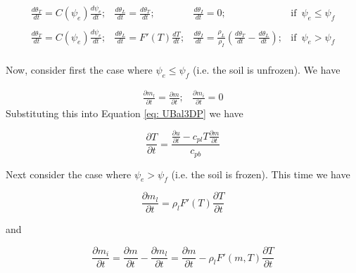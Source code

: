 \documentclass[10pt,a4paper]{article}
\begin{document}
\begin{equation} \label{eq_thetaPart}
	\begin{array}{llll}
		\displaystyle \frac{d\theta_T}{dt} = C(\psi_e)\frac{d\psi_e}{dt};
		& \displaystyle \frac{d\theta_L}{dt} = \frac{d\theta_T}{dt};
		& \displaystyle \frac{d\theta_I}{dt} = 0;
		& \displaystyle \mathrm{if}\hspace{6pt} \psi_e\leq\psi_f\\
		\\
		\displaystyle \frac{d\theta_T}{dt} = C(\psi_e)\frac{d\psi_e}{dt};
		& \displaystyle \frac{d\theta_L}{dt} = F'(T)\frac{dT}{dt};
		& \displaystyle \frac{d\theta_I}{dt} = \frac{\rho_L}{\rho_I}\left(\frac{d\theta_T}{dt}-\frac{d\theta_L}{dt}\right);
		& \displaystyle \mathrm{if}\hspace{6pt} \psi_e>\psi_f\\
	\end{array}
\end{equation}

Now, consider first the case where $\psi_e \leq \psi_f$ (i.e. the soil is unfrozen). We have 

\begin{equation}
	\begin{array}{cc}
\displaystyle \frac{\partial m_l}{\partial t}=\frac{\partial m}{\partial t};
& 
\displaystyle \frac{\partial m_i}{\partial t}=0
	\end{array}
\end{equation}
%
Substituting this into Equation \ref{eq: UBal3DP} we have

\begin{equation} \label{eq: unfrozen_dT}
\frac{\partial T}{\partial t}
=
\frac{\displaystyle\frac{\partial u}{\partial t}
-c_{pl}T
\frac{\partial m}{\partial t}
}{c_{pb}
}
\end{equation}

Next consider the case where $\psi_e > \psi_f$ (i.e. the soil is frozen). This time we have

\begin{equation}
\frac{\partial m_l}{\partial t}=\rho_lF'(T)\frac{\partial T}{\partial t}
\end{equation}

and

\begin{equation}
\frac{\partial m_i}{\partial t}=\frac{\partial m}{\partial t}-\frac{\partial m_l}{\partial t}
=
\frac{\partial m}{\partial t}-\rho_lF'(m,T)\frac{\partial T}{\partial t}
\end{equation}
\end{document}
